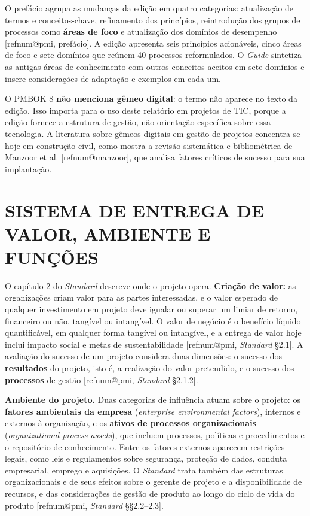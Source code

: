 \documentclass[12pt,a4paper,article,oneside,english,brazil]{abntex2}
\makeatletter
\newcommand{\refnum}[1]{\csname refnum@#1\endcsname}
\makeatother
\begin{document}
O prefácio agrupa as mudanças da edição em quatro categorias: atualização de termos e conceitos-chave, refinamento dos princípios, reintrodução dos grupos de processos como \textbf{áreas de foco} e atualização dos domínios de desempenho [\refnum{pmi}, prefácio]. A edição apresenta seis princípios acionáveis, cinco áreas de foco e sete domínios que reúnem 40 processos reformulados. O \textit{Guide} sintetiza as antigas áreas de conhecimento com outros conceitos aceitos em sete domínios e insere considerações de adaptação e exemplos em cada um.

O PMBOK 8 \textbf{não menciona gêmeo digital}: o termo não aparece no texto da edição. Isso importa para o uso deste relatório em projetos de TIC, porque a edição fornece a estrutura de gestão, não orientação específica sobre essa tecnologia. A literatura sobre gêmeos digitais em gestão de projetos concentra-se hoje em construção civil, como mostra a revisão sistemática e bibliométrica de Manzoor et al. [\refnum{manzoor}], que analisa fatores críticos de sucesso para sua implantação.

\section{SISTEMA DE ENTREGA DE VALOR, AMBIENTE E FUNÇÕES}

O capítulo 2 do \textit{Standard} descreve onde o projeto opera. \textbf{Criação de valor:} as organizações criam valor para as partes interessadas, e o valor esperado de qualquer investimento em projeto deve igualar ou superar um limiar de retorno, financeiro ou não, tangível ou intangível. O valor de negócio é o benefício líquido quantificável, em qualquer forma tangível ou intangível, e a entrega de valor hoje inclui impacto social e metas de sustentabilidade [\refnum{pmi}, \textit{Standard} §2.1]. A avaliação do sucesso de um projeto considera duas dimensões: o sucesso dos \textbf{resultados} do projeto, isto é, a realização do valor pretendido, e o sucesso dos \textbf{processos} de gestão [\refnum{pmi}, \textit{Standard} §2.1.2].

\textbf{Ambiente do projeto.} Duas categorias de influência atuam sobre o projeto: os \textbf{fatores ambientais da empresa} (\textit{enterprise environmental factors}), internos e externos à organização, e os \textbf{ativos de processos organizacionais} (\textit{organizational process assets}), que incluem processos, políticas e procedimentos e o repositório de conhecimento. Entre os fatores externos aparecem restrições legais, como leis e regulamentos sobre segurança, proteção de dados, conduta empresarial, emprego e aquisições. O \textit{Standard} trata também das estruturas organizacionais e de seus efeitos sobre o gerente de projeto e a disponibilidade de recursos, e das considerações de gestão de produto ao longo do ciclo de vida do produto [\refnum{pmi}, \textit{Standard} §§2.2–2.3].
\end{document}
